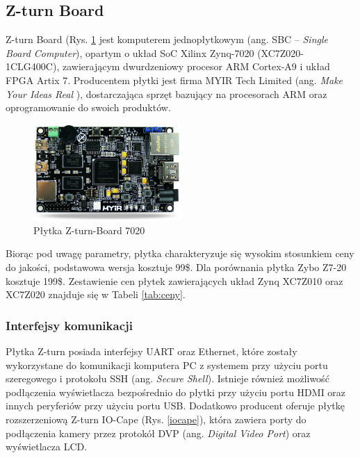 \subsection{Z-turn Board}

Z-turn Board (Rys. \ref{zturn_board} jest komputerem jednopłytkowym 
(ang. SBC – \emph{Single Board Computer}), opartym o układ SoC Xilinx 
Zynq-7020 (XC7Z020-1CLG400C), zawierającym dwurdzeniowy procesor ARM Cortex-A9 
i układ FPGA Artix 7. Producentem płytki jest firma MYIR Tech Limited (ang. \emph{Make 
Your Ideas Real} ), dostarczająca sprzęt bazujący na procesorach ARM oraz 
oprogramowanie do swoich produktów\cite{myir}. 

\begin{figure}[h]
  \centering
  \includegraphics[width=0.5\textwidth]{img/zturn_board.jpg}
  \caption{Płytka Z-turn-Board 7020}
  \label{zturn_board}
\end{figure}

Biorąc pod uwagę parametry, płytka 
charakteryzuje się wysokim stosunkiem ceny do jakości, podstawowa wersja kosztuje
99\$. Dla porównania płytka Zybo Z7-20 kosztuje 199\$. Zestawienie cen płytek 
zawierających układ Zynq XC7Z010 oraz XC7Z020 znajduje się w Tabeli \ref{tab:ceny}. 

\subsubsection{Interfejsy komunikacji}

Płytka Z-turn posiada interfejsy UART oraz Ethernet, które zostały wykorzystane do komunikacji komputera PC z systemem przy użyciu portu szeregowego  
i protokołu SSH (ang. \emph{Secure Shell}). Istnieje również możliwość podłączenia wyświetlacza bezpośrednio do płytki przy użyciu portu HDMI oraz innych peryferiów przy użyciu portu USB. Dodatkowo producent oferuje płytkę rozszerzeniową Z-turn IO-Cape (Rys. \ref{iocape}), która zawiera porty do podłączenia kamery przez protokół DVP (ang. \emph{Digital Video Port}) oraz wyświetlacza LCD. 


